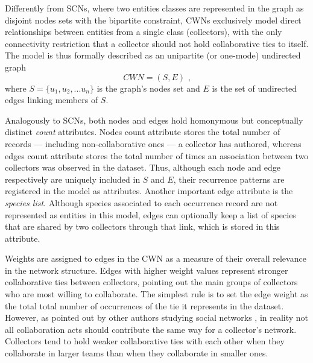 {Differently from SCNs, where two entities classes are represented in the graph as disjoint nodes sets with the bipartite constraint, CWNs exclusively model direct relationships between entities from a single class (collectors), with the only connectivity restriction that a collector should not hold collaborative ties to itself.
The model is thus formally described as an unipartite (or one-mode) undirected graph
$$CWN = (S,E) \mbox{ ,}$$
where $S=\{u_1,u_2,...u_n\}$ is the graph's nodes set and $E$ is the set of undirected edges linking members of $S$.

Analogously to SCNs, both nodes and edges hold homonymous but conceptually distinct \textit{count} attributes.
Nodes count attribute stores the total number of records --- including non-collaborative ones --- a collector has authored, whereas
edges count attribute stores the total number of times an association between two collectors was observed in the dataset. Thus, although each node and edge respectively are uniquely included in $S$ and $E$, their recurrence patterns are registered in the model as attributes.
Another important edge attribute is the \textit{species list}. Although species associated to each occurrence record are not represented as entities in this model, edges can optionally keep a list of species that are shared by two collectors through that link, which is stored in this attribute.

Weights are assigned to edges in the CWN as a measure of their overall relevance in the network structure. Edges with higher weight values represent stronger collaborative ties between collectors, pointing out the main groups of collectors who are most willing to collaborate. 
The simplest rule is to set the edge weight as the total total number of occurrences of the tie it represents in the dataset. However, as pointed out by other authors studying social networks \cite{Newman2001a}, in reality not all collaboration acts should contribute the same way for a collector's network. 
Collectors tend to hold weaker collaborative ties with each other when they collaborate in larger teams than when they collaborate in smaller ones. 

}
